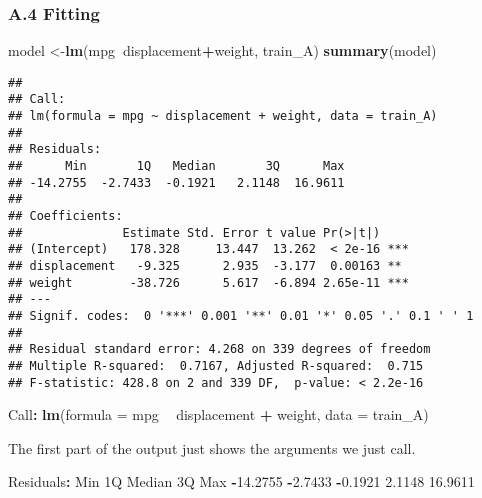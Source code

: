 \documentclass[]{article}
\newenvironment{Shaded}{\begin{snugshade}}{\end{snugshade}}
\newcommand{\KeywordTok}[1]{\textcolor[rgb]{0.13,0.29,0.53}{\textbf{#1}}}
\newcommand{\DataTypeTok}[1]{\textcolor[rgb]{0.13,0.29,0.53}{#1}}
\newcommand{\FloatTok}[1]{\textcolor[rgb]{0.00,0.00,0.81}{#1}}
\newcommand{\StringTok}[1]{\textcolor[rgb]{0.31,0.60,0.02}{#1}}
\newcommand{\OperatorTok}[1]{\textcolor[rgb]{0.81,0.36,0.00}{\textbf{#1}}}
\newcommand{\NormalTok}[1]{#1}
\begin{document}
\subsubsection{A.4 Fitting}\label{a.4-fitting}

\begin{Shaded}
\begin{Highlighting}[]
\NormalTok{model <-}\KeywordTok{lm}\NormalTok{(mpg}\OperatorTok{~}\NormalTok{displacement}\OperatorTok{+}\NormalTok{weight, train_A)}
\KeywordTok{summary}\NormalTok{(model)}
\end{Highlighting}
\end{Shaded}

\begin{verbatim}
## 
## Call:
## lm(formula = mpg ~ displacement + weight, data = train_A)
## 
## Residuals:
##      Min       1Q   Median       3Q      Max 
## -14.2755  -2.7433  -0.1921   2.1148  16.9611 
## 
## Coefficients:
##              Estimate Std. Error t value Pr(>|t|)    
## (Intercept)   178.328     13.447  13.262  < 2e-16 ***
## displacement   -9.325      2.935  -3.177  0.00163 ** 
## weight        -38.726      5.617  -6.894 2.65e-11 ***
## ---
## Signif. codes:  0 '***' 0.001 '**' 0.01 '*' 0.05 '.' 0.1 ' ' 1
## 
## Residual standard error: 4.268 on 339 degrees of freedom
## Multiple R-squared:  0.7167, Adjusted R-squared:  0.715 
## F-statistic: 428.8 on 2 and 339 DF,  p-value: < 2.2e-16
\end{verbatim}

\begin{Shaded}
\begin{Highlighting}[]
\NormalTok{Call}\OperatorTok{:}
\KeywordTok{lm}\NormalTok{(}\DataTypeTok{formula =}\NormalTok{ mpg }\OperatorTok{~}\StringTok{ }\NormalTok{displacement }\OperatorTok{+}\StringTok{ }\NormalTok{weight, }\DataTypeTok{data =}\NormalTok{ train_A)}
\end{Highlighting}
\end{Shaded}

The first part of the output just shows the arguments we just call.

\begin{Shaded}
\begin{Highlighting}[]
\NormalTok{Residuals}\OperatorTok{:}
\StringTok{     }\NormalTok{Min       1Q   Median       3Q      Max }
\OperatorTok{-}\FloatTok{14.2755}  \OperatorTok{-}\FloatTok{2.7433}  \OperatorTok{-}\FloatTok{0.1921}   \FloatTok{2.1148}  \FloatTok{16.9611}
\end{Highlighting}
\end{Shaded}
\end{document}
